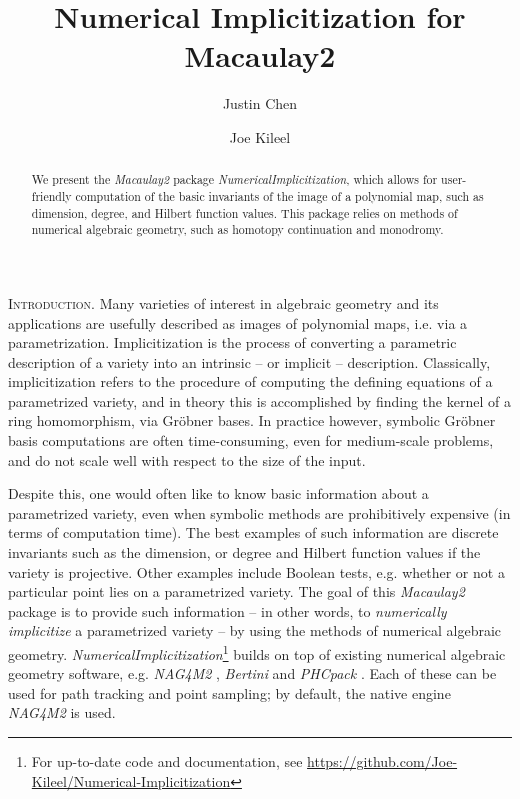 \documentclass[letter]{amsart}
\theoremstyle{definition}
\begin{document}
\title{\bf{Numerical Implicitization for Macaulay2}}

\author{Justin Chen}
\address{Department of Mathematics, University of California, Berkeley,
California, 94720 U.S.A}

\author{Joe Kileel}


\begin{abstract}
We present the {\textit{Macaulay2}} package {\textit{NumericalImplicitization}}, which allows for user-friendly computation of the basic invariants of the image of a polynomial map, such as dimension, degree, and Hilbert function values.  This package relies on methods of numerical algebraic geometry, such as homotopy continuation and monodromy.
\end{abstract}

\maketitle

\noindent
\textsc{Introduction.} Many varieties of interest in algebraic geometry and its applications are usefully described as images of polynomial maps, i.e. via a parametrization. Implicitization is the process of converting a parametric description of a variety into an intrinsic -- or implicit -- description. Classically, implicitization refers to the procedure of computing the defining equations of a parametrized variety, and in theory this is accomplished by finding the kernel of a ring homomorphism, via Gr\"obner bases. In practice however, symbolic Gr\"obner basis computations are often time-consuming, even for medium-scale problems, and do not scale well with respect to the size of the input.

Despite this, one would often like to know basic information about a parametrized variety, even when symbolic methods are prohibitively expensive (in terms of computation time). The best examples of such information are discrete invariants such as the dimension, or degree and Hilbert function values if the variety is projective. Other examples include Boolean tests, e.g. whether or not a particular point lies on a parametrized variety. The goal of this \textit{Macaulay2} \cite{M2} package is to provide such information -- in other words, to \textit{numerically implicitize} a parametrized variety -- by using the methods of numerical algebraic geometry. \textit{NumericalImplicitization}\footnote{For up-to-date code and documentation, see \url{https://github.com/Joe-Kileel/Numerical-Implicitization}}
builds on top of existing numerical algebraic geometry software, e.g. \textit{NAG4M2} \cite{Ley}, \textit{Bertini} \cite{Ber, BGLR} and \textit{PHCpack} \cite{PHC, GPV}.  Each of these can be used for path tracking
and point sampling; by default, the native engine \textit{NAG4M2} is used.
\vspace{0.3cm}
\end{document}

